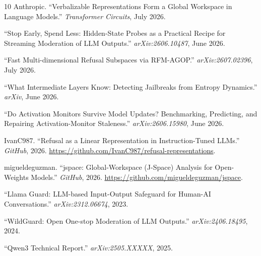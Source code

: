 \documentclass[11pt,twocolumn]{article}
\begin{document}
\begin{thebibliography}{10}
Anthropic. ``Verbalizable Representations Form a Global Workspace in Language Models.'' \emph{Transformer Circuits}, July 2026.

``Stop Early, Spend Less: Hidden-State Probes as a Practical Recipe for Streaming Moderation of LLM Outputs.'' \emph{arXiv:2606.10487}, June 2026.

``Fast Multi-dimensional Refusal Subspaces via RFM-AGOP.'' \emph{arXiv:2607.02396}, July 2026.

``What Intermediate Layers Know: Detecting Jailbreaks from Entropy Dynamics.'' \emph{arXiv}, June 2026.

``Do Activation Monitors Survive Model Updates? Benchmarking, Predicting, and Repairing Activation-Monitor Staleness.'' \emph{arXiv:2606.15980}, June 2026.

IvanC987. ``Refusal as a Linear Representation in Instruction-Tuned LLMs.'' \emph{GitHub}, 2026. \url{https://github.com/IvanC987/refusal-representations}.

migueldeguzman. ``jspace: Global-Workspace (J-Space) Analysis for Open-Weights Models.'' \emph{GitHub}, 2026. \url{https://github.com/migueldeguzman/jspace}.

``Llama Guard: LLM-based Input-Output Safeguard for Human-AI Conversations.'' \emph{arXiv:2312.06674}, 2023.

``WildGuard: Open One-stop Moderation of LLM Outputs.'' \emph{arXiv:2406.18495}, 2024.

``Qwen3 Technical Report.'' \emph{arXiv:2505.XXXXX}, 2025.

\end{thebibliography}
\end{document}
